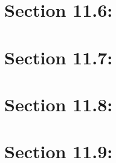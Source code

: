 \documentclass[oneside]{book}
\begin{document}


\section{Section 11.6: }



\section{Section 11.7: }



\section{Section 11.8: }



\section{Section 11.9: }


\end{document}

